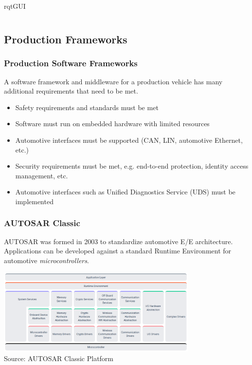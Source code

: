 \begin{frame}
\begin{columns}[]
\begin{column}{0.35\textwidth}
        \scriptsize rqt\footnotemark[3] GUI
    \end{column}
\end{columns}
\end{frame}

\subsection{Production Frameworks}

\begin{frame}
\frametitle{Production Software Frameworks}
A software framework and middleware for a production vehicle has many
additional requirements that need to be met.

\begin{itemize}
    \item Safety requirements and standards must be met
    \item Software must run on embedded hardware with limited resources
    \item Automotive interfaces must be supported (CAN, LIN, automotive
        Ethernet, etc.)
    \item Security requirements must be met, e.g. end-to-end protection, 
        identity access management, etc.
    \item Automotive interfaces such as Unified Diagnostics Service (UDS) must
        be implemented
\end{itemize}
\end{frame}

\begin{frame}
\frametitle{AUTOSAR Classic}
AUTOSAR was formed in 2003 to standardize automotive E/E architecture.
Applications can be developed against a standard Runtime Environment
for automotive \emph{microcontrollers}.
\begin{center}
\includegraphics[width=0.75\textwidth]{images/autosar_classic.png}\\
\footnotesize  Source: AUTOSAR Classic Platform\footnotemark[1]
\end{center}
\end{frame}

